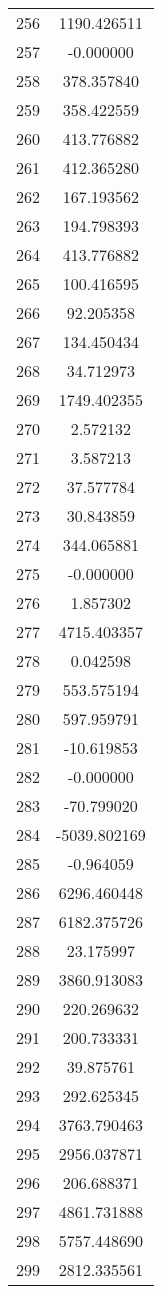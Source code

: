 \documentclass[12pt]{article}
\begin{document}
\begin{longtable}{@{}cc@{}}
256 & 1190.426511 \\
257 & -0.000000 \\
258 & 378.357840 \\
259 & 358.422559 \\
260 & 413.776882 \\
261 & 412.365280 \\
262 & 167.193562 \\
263 & 194.798393 \\
264 & 413.776882 \\
265 & 100.416595 \\
266 & 92.205358 \\
267 & 134.450434 \\
268 & 34.712973 \\
269 & 1749.402355 \\
270 & 2.572132 \\
271 & 3.587213 \\
272 & 37.577784 \\
273 & 30.843859 \\
274 & 344.065881 \\
275 & -0.000000 \\
276 & 1.857302 \\
277 & 4715.403357 \\
278 & 0.042598 \\
279 & 553.575194 \\
280 & 597.959791 \\
281 & -10.619853 \\
282 & -0.000000 \\
283 & -70.799020 \\
284 & -5039.802169 \\
285 & -0.964059 \\
286 & 6296.460448 \\
287 & 6182.375726 \\
288 & 23.175997 \\
289 & 3860.913083 \\
290 & 220.269632 \\
291 & 200.733331 \\
292 & 39.875761 \\
293 & 292.625345 \\
294 & 3763.790463 \\
295 & 2956.037871 \\
296 & 206.688371 \\
297 & 4861.731888 \\
298 & 5757.448690 \\
299 & 2812.335561 \\

\end{longtable}
\end{document}
